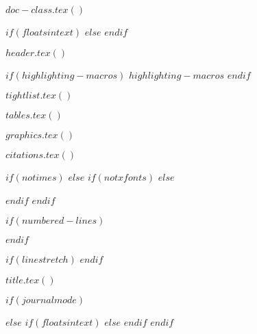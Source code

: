 $doc-class.tex()$

\RequirePackage{longtable}
\RequirePackage{threeparttablex}

% 
$if(floatsintext)$
$else$
$endif$





$header.tex()$

$if(highlighting-macros)$
$highlighting-macros$
$endif$

$tightlist.tex()$

$tables.tex()$

$graphics.tex()$

$citations.tex()$
  

$if(notimes)$
$else$
$if(notxfonts)$
    $else$
\usepackage{times}
    $endif$
$endif$

$if(numbered-lines)$
\usepackage{lineno}
$endif$

$if(linestretch)$
$endif$

$title.tex()$

$if(journalmode)$
\usepackage{float}
\makeatletter
\let\oldtpt\ThreePartTable
\let\endoldtpt\endThreePartTable
\def\ThreePartTable{\@ifnextchar[\ThreePartTable@i \ThreePartTable@ii}
\def\ThreePartTable@i[#1]{\begin{figure}
\onecolumn
\begin{minipage}{0.5\textwidth}
\oldtpt[#1]
}
\def\ThreePartTable@ii{\begin{figure}
\onecolumn
\begin{minipage}{0.5\textwidth}
\oldtpt
}
\def\endThreePartTable{
\endoldtpt
\end{minipage}
\twocolumn
\end{figure}}
\makeatother


\makeatletter
\let\endoldlt\endlongtable		
\def\endlongtable{
\hline
\endoldlt}
\makeatother

\newenvironment{twocolumntable}%
{%
\begin{table*}%
\onecolumn%
}%
{%
\twocolumn%
\end{table*}%
}%
$else$
\makeatletter
\let\endoldlt\endlongtable
\def\endlongtable{
\hline
\endoldlt
}
\makeatother
$if(floatsintext)$
$else$
\RequirePackage{longtable}
$endif$
$endif$

